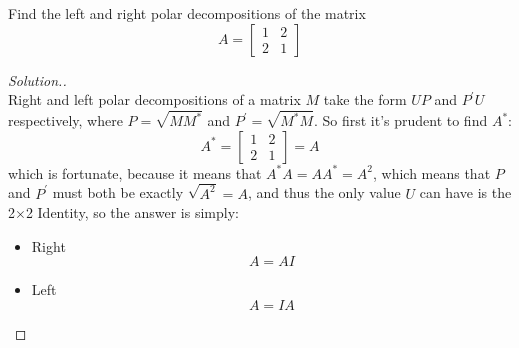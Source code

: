 \documentclass[12pt]{article}
\newenvironment{problem}[2][Problem]{\begin{trivlist}
\item[\hskip \labelsep {\bfseries #1}\hskip \labelsep {\bfseries #2.}]}{\end{trivlist}}
\begin{document}
\begin{problem}{F1}
Find the left and right polar decompositions of
the matrix
$$A=\begin{bmatrix}
1 & 2\\
2 & 1
\end{bmatrix}$$
\end{problem}

\begin{proof}[Solution.]~\\
Right and left polar decompositions of a matrix $M$ take the form $UP$ and
$P^\prime U$ respectively, where $P=\sqrt{MM^*}$ and
$P^\prime=\sqrt{M^*M}$. So first it's prudent to find $A^*$:
$$A^*=\begin{bmatrix}
1 & 2\\
2 & 1
\end{bmatrix}=A$$
which is fortunate, because it means that $A^*A=AA^*=A^2$, which means that $P$
and $P^\prime$ must both be exactly $\sqrt{A^2}=A$, and thus the only value $U$
can have is the 2$\times$2 Identity, so the answer is simply:
\begin{itemize}
\item Right
$$A=AI$$
\item Left
$$A=IA$$
\end{itemize}
\end{proof}
 
\end{document}
